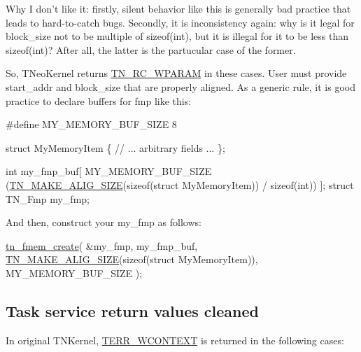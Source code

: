 Why I don't like it\+: firstly, silent behavior like this is generally bad practice that leads to hard-\/to-\/catch bugs. Secondly, it is inconsistency again\+: why is it legal for {\ttfamily block\+\_\+size} not to be multiple of {\ttfamily sizeof(int)}, but it is illegal for it to be less than {\ttfamily sizeof(int)}? After all, the latter is the partucular case of the former.

So, T\+Neo\+Kernel returns {\ttfamily \hyperlink{tn__common_8h_aa43bd3da1ad4c1e61224b5f23b369876a89909a6426b477a38496a1be67590e68}{T\+N\+\_\+\+R\+C\+\_\+\+W\+P\+A\+R\+A\+M}} in these cases. User must provide {\ttfamily start\+\_\+addr} and {\ttfamily block\+\_\+size} that are properly aligned. As a generic rule, it is good practice to declare buffers for fmp like this\+:


\begin{DoxyCode}
\textcolor{preprocessor}{#define MY\_MEMORY\_BUF\_SIZE    8}

\textcolor{keyword}{struct }MyMemoryItem \{
   \textcolor{comment}{// ... arbitrary fields ...}
\};

\textcolor{keywordtype}{int} my\_fmp\_buf[
        MY\_MEMORY\_BUF\_SIZE 
        (\hyperlink{tn__common_8h_a3f48380e8a624edc643319a81192d88e}{TN\_MAKE\_ALIG\_SIZE}(\textcolor{keyword}{sizeof}(\textcolor{keyword}{struct} MyMemoryItem)) / \textcolor{keyword}{sizeof}(\textcolor{keywordtype}{int}))
      ];
\textcolor{keyword}{struct }TN\_Fmp my\_fmp;
\end{DoxyCode}


And then, construct your {\ttfamily my\+\_\+fmp} as follows\+:


\begin{DoxyCode}
\hyperlink{tn__fmem_8h_a56d47d4a1b6453d959336448a0ce96ac}{tn\_fmem\_create}( &my\_fmp,
                my\_fmp\_buf,
                \hyperlink{tn__common_8h_a3f48380e8a624edc643319a81192d88e}{TN\_MAKE\_ALIG\_SIZE}(\textcolor{keyword}{sizeof}(\textcolor{keyword}{struct} MyMemoryItem)),
                MY\_MEMORY\_BUF\_SIZE );
\end{DoxyCode}
\hypertarget{tnkernel_diff_tnkernel_diff_task_retval}{}\subsection{Task service return values cleaned}\label{tnkernel_diff_tnkernel_diff_task_retval}
In original T\+N\+Kernel, {\ttfamily \hyperlink{tn__oldsymbols_8h_ad591ae7c53bbb81247492ea1d34a70b6}{T\+E\+R\+R\+\_\+\+W\+C\+O\+N\+T\+E\+X\+T}} is returned in the following cases\+:


